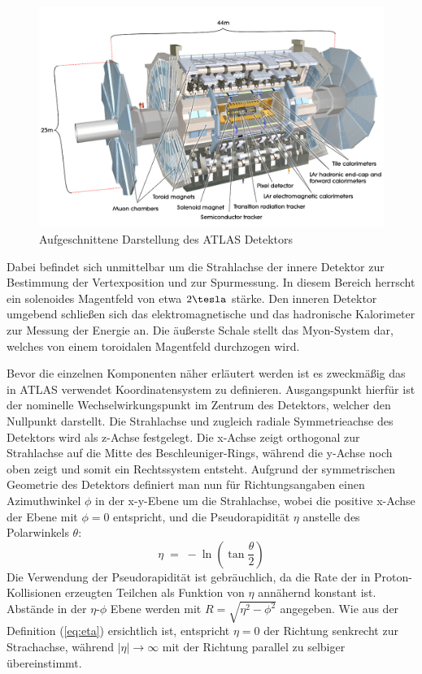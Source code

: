 \begin{figure}
    \centering
    \includegraphics[width=1.0\textwidth]{img/atlas}
    \caption[Aufgeschnittene Darstellung des ATLAS Detektors]
        {Aufgeschnittene Darstellung des ATLAS Detektors}
    \label{fig:atlas}
\end{figure}

Dabei befindet sich unmittelbar um die Strahlachse der innere Detektor zur
Bestimmung der Vertexposition und zur Spurmessung. In diesem Bereich herrscht
ein solenoides Magentfeld von etwa $2\tesla$ stärke. Den inneren Detektor
umgebend schließen sich das elektromagnetische und das hadronische Kalorimeter
zur Messung der Energie an. Die äußerste Schale stellt das Myon-System dar,
welches von einem toroidalen Magentfeld durchzogen wird.

Bevor die einzelnen Komponenten näher erläutert werden ist es zweckmäßig das in
ATLAS verwendet Koordinatensystem zu definieren. Ausgangspunkt hierfür ist der
nominelle Wechselwirkungspunkt im Zentrum des Detektors, welcher den Nullpunkt
darstellt. Die Strahlachse und zugleich radiale Symmetrieachse des Detektors
wird als z-Achse festgelegt. Die x-Achse zeigt orthogonal zur Strahlachse auf
die Mitte des Beschleuniger-Rings, während die y-Achse noch oben zeigt und
somit ein Rechtssystem entsteht. Aufgrund der symmetrischen Geometrie des
Detektors definiert man nun für Richtungsangaben einen Azimuthwinkel
$\phi$ in der x-y-Ebene um die Strahlachse, wobei die positive x-Achse der
Ebene mit $\phi=0$ entspricht, und die Pseudorapidität $\eta$ anstelle des
Polarwinkels $\theta$:
\begin{equation}
    \eta \; = \; - \ln \left( \tan\frac{\theta}{2} \right)
    \label{eq:eta}
\end{equation}
Die Verwendung der Pseudorapidität ist gebräuchlich, da die Rate der in
Proton-Kollisionen erzeugten Teilchen als Funktion von $\eta$ annähernd
konstant ist. Abstände in der $\eta$-$\phi$ Ebene werden mit
$R=\sqrt{\eta^2-\phi^2}$ angegeben. Wie aus der Definition (\ref{eq:eta})
ersichtlich ist, entspricht $\eta=0$ der Richtung senkrecht zur Strachachse,
während $|\eta| \rightarrow \infty$ mit der Richtung parallel zu selbiger
übereinstimmt.

